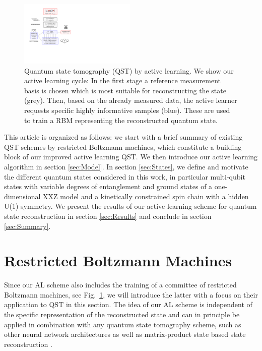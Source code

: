 \documentclass[pra,aps,showpacs,groupedaddress,superscriptaddress,twocolumn,toc=flat,biblatex,footinbib]{revtex4-1}
\begin{document}
\begin{figure}[t]
	\centering
  \includegraphics[width=0.495\textwidth]{Fig1.pdf}
	\caption[Active learning procedure]{Quantum state tomography (QST) by active learning. We show our active learning cycle: In the first stage a reference measurement basis is chosen which is most suitable for reconstructing the state (grey). Then, based on the already measured data, the active learner requests specific highly informative samples (blue). These are used to train a RBM representing the reconstructed quantum state.}
	\label{fig:AL}
\end{figure}

This article is organized as follows: we start with a brief summary of existing QST schemes by restricted Boltzmann machines, which constitute a building block of our improved active learning QST. We then introduce our active learning algorithm in section \ref{sec:Model}. In section \ref{sec:States}, we define and motivate the different quantum states considered in this work, in particular multi-qubit states with variable degrees of entanglement and ground states of a one-dimensional XXZ model and a kinetically constrained spin chain with a hidden U(1) symmetry. We present the results of our active learning scheme for quantum state reconstruction in section \ref{sec:Results} and conclude in section \ref{sec:Summary}. 

\section{Restricted Boltzmann Machines}

Since our AL scheme also includes the training of a committee of restricted Boltzmann machines, see Fig.~\ref{fig:AL}, we will introduce the latter with a focus on their application to QST in this section. The idea of our AL scheme is independent of the specific representation of the reconstructed state and can in principle be applied in combination with any quantum state tomography scheme, such as other neural network architectures \cite{Rocchetto2018,Morawetz2021,Schmale2021,Ahmed2021,Cha2021} as well as matrix-product state based state reconstruction \cite{Cramer2010,Baumgratz2013}. 
\end{document}
